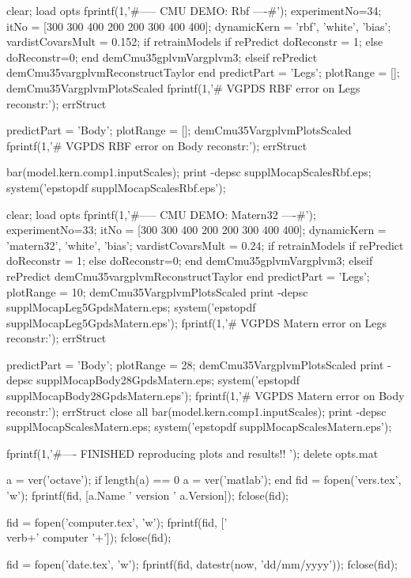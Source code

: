 \begin{matlab}

clear; load opts
fprintf(1,'\n\n#-----  CMU DEMO: Rbf ----#\n');
experimentNo=34; 
itNo = [300 300 400 200 200 300 400 400];
dynamicKern = {'rbf', 'white', 'bias'};
vardistCovarsMult = 0.152;
if retrainModels 
    if rePredict
        doReconstr = 1;
    else
        doReconstr=0;
    end
    demCmu35gplvmVargplvm3;
elseif rePredict
    demCmu35vargplvmReconstructTaylor
end
predictPart = 'Legs';  plotRange = [];
demCmu35VargplvmPlotsScaled
fprintf(1,'# VGPDS RBF error on Legs reconstr:');
errStruct

predictPart = 'Body';  plotRange = [];
demCmu35VargplvmPlotsScaled
fprintf(1,'# VGPDS RBF error on Body reconstr:');
errStruct

bar(model.kern.comp{1}.inputScales);
print -depsc supplMocapScalesRbf.eps; system('epstopdf supplMocapScalesRbf.eps');


clear; load opts
fprintf(1,'\n\n#-----  CMU DEMO: Matern32 ----#\n');
experimentNo=33; 
itNo = [300 300 400 200 200 300 400 400];
dynamicKern = {'matern32', 'white', 'bias'};
vardistCovarsMult = 0.24;
if retrainModels 
    if rePredict
        doReconstr = 1;
    else
        doReconstr=0;
    end
    demCmu35gplvmVargplvm3;
elseif rePredict
    demCmu35vargplvmReconstructTaylor
end
predictPart = 'Legs'; plotRange = 10;
demCmu35VargplvmPlotsScaled
print -depsc supplMocapLeg5GpdsMatern.eps; system('epstopdf supplMocapLeg5GpdsMatern.eps');
fprintf(1,'# VGPDS Matern error on Legs reconstr:');
errStruct

predictPart = 'Body'; plotRange = 28;
demCmu35VargplvmPlotsScaled
print -depsc supplMocapBody28GpdsMatern.eps; system('epstopdf supplMocapBody28GpdsMatern.eps');
fprintf(1,'# VGPDS Matern error on Body reconstr:');
errStruct
close all
bar(model.kern.comp{1}.inputScales);
print -depsc supplMocapScalesMatern.eps; system('epstopdf supplMocapScalesMatern.eps');


fprintf(1,'\n\n#---- FINISHED reproducing plots and results!! \n');
delete opts.mat


a = ver('octave');
if length(a) == 0
  a = ver('matlab');
end
fid = fopen('vers.tex', 'w');
fprintf(fid, [a.Name ' version ' a.Version]);
fclose(fid);

fid = fopen('computer.tex', 'w');
fprintf(fid, ['\\verb+' computer '+']);
fclose(fid);

fid = fopen('date.tex', 'w');
fprintf(fid, datestr(now, 'dd/mm/yyyy'));
fclose(fid);

\end{matlab}

